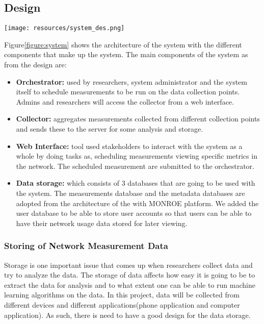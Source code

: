 \subsection{Design}\label{subsec:design}
\begin{figure*}
    \begin{center}
        \texttt{[image: resources/system\_des.png]}
    \end{center}
    \caption{Showing the system overview, different components making the system and the communication directions between these components in the systems.}
    \label{figure:system}
\end{figure*}
Figure\ref{figure:system} shows the architecture of the system with the different components that make up the system.
The main components of the system as from the design are:
\begin{itemize}
     \item \textbf{Orchestrator:} used by researchers, system administrator and the system itself to schedule measurements to be run on the data collection points.
     Admins and researchers will access the collector from a web interface.
    \item \textbf{Collector:} aggregates measurements collected from different collection points and sends these to the server for some analysis and storage.
    \item \textbf{Web Interface:} tool used stakeholders to interact with the system as a whole by doing tasks as, scheduling measurements viewing specific metrics in the network.
     The scheduled measurement are submitted to the orchestrator.
    \item \textbf{Data storage:} which consists of 3 databases that are going to be used with the system.
    The measurements database and the metadata databases are adopted from the architecture of the with MONROE platform\cite{7523537}.
    We added the user database to be able to store user accounts so that users can be able to have their network usage data stored for later viewing.
\end{itemize}
\subsubsection{Storing of Network Measurement Data}
Storage is one important issue that comes up when researchers collect data and try to analyze the data.
The storage of data affects how easy it is going to be to extract the data for analysis and to what extent one can be able to run machine learning algorithms on the data.
In this project, data will be collected from different devices and different applications(phone application and computer application).
As such, there is need to have a good design for the data storage.
